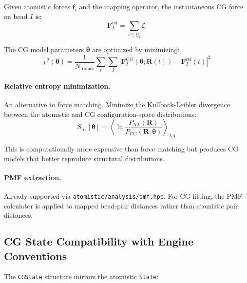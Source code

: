 \documentclass[11pt]{article}
\newcommand{\file}[1]{\texttt{#1}}
\newcommand{\type}[1]{\texttt{#1}}
\begin{document}
Given atomistic forces $\mathbf{f}_i$ and the mapping operator, the
instantaneous CG force on bead $I$ is:
\begin{equation}
  \mathbf{F}_I^\text{ref} = \sum_{i \in \mathcal{G}_I} \mathbf{f}_i
  \label{eq:force_matching}
\end{equation}

The CG model parameters $\boldsymbol{\theta}$ are optimized by minimizing:
\begin{equation}
  \chi^2(\boldsymbol{\theta}) =
    \frac{1}{N_\text{frames}} \sum_{t} \sum_{I}
    \left| \mathbf{F}_I^\text{CG}(\boldsymbol{\theta}; \mathbf{R}(t))
         - \mathbf{F}_I^\text{ref}(t) \right|^2
  \label{eq:force_matching_chi2}
\end{equation}

\paragraph{Relative entropy minimization.}

An alternative to force matching.  Minimize the Kullback-Leibler divergence
between the atomistic and CG configuration-space distributions:
\begin{equation}
  S_\text{rel}[\boldsymbol{\theta}]
    = \left\langle \ln \frac{P_\text{AA}(\mathbf{R})}
                             {P_\text{CG}(\mathbf{R}; \boldsymbol{\theta})}
      \right\rangle_\text{AA}
  \label{eq:relative_entropy}
\end{equation}

This is computationally more expensive than force matching but produces
CG models that better reproduce structural distributions.

\paragraph{PMF extraction.}

Already supported via \file{atomistic/analysis/pmf.hpp}.  For CG fitting,
the PMF calculator is applied to mapped bead-pair distances rather than
atomistic pair distances.

\subsection{CG State Compatibility with Engine Conventions}

The \type{CGState} structure mirrors the atomistic \type{State}:
\end{document}
